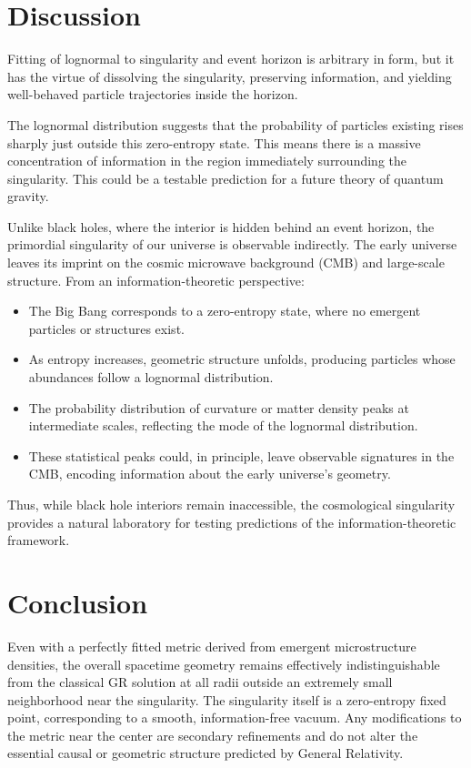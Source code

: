 \documentclass[11pt]{article}
\begin{document}
\section{Discussion}
Fitting of lognormal to singularity and event horizon is arbitrary in form, but it has the virtue of dissolving the singularity, preserving information, and
yielding well-behaved particle trajectories inside the horizon.

The lognormal distribution suggests that the probability of particles existing rises sharply just outside this zero-entropy state.
This means there is a massive concentration of information in the region immediately surrounding the singularity. This could be a testable prediction for a future theory of quantum gravity.

Unlike black holes, where the interior is hidden behind an event horizon, the primordial singularity of our universe is observable indirectly.
The early universe leaves its imprint on the cosmic microwave background (CMB) and large-scale structure. From an information-theoretic perspective:
\begin{itemize}
    \item The Big Bang corresponds to a zero-entropy state, where no emergent particles or structures exist.
    \item As entropy increases, geometric structure unfolds, producing particles whose abundances follow a lognormal distribution.
    \item The probability distribution of curvature or matter density peaks at intermediate scales, reflecting the mode of the lognormal distribution.
    \item These statistical peaks could, in principle, leave observable signatures in the CMB, encoding information about the early universe’s geometry.
\end{itemize}

Thus, while black hole interiors remain inaccessible, the cosmological singularity provides a natural laboratory for testing predictions of the information-theoretic framework.


\section{Conclusion}

Even with a perfectly fitted metric derived from emergent microstructure densities, the overall spacetime geometry remains effectively indistinguishable
from the classical GR solution at all radii outside an extremely small neighborhood near the singularity.
The singularity itself is a zero-entropy fixed point, corresponding to a smooth, information-free vacuum. Any modifications to the metric near the center are
secondary refinements and do not alter the essential causal or geometric structure predicted by General Relativity.
\end{document}
